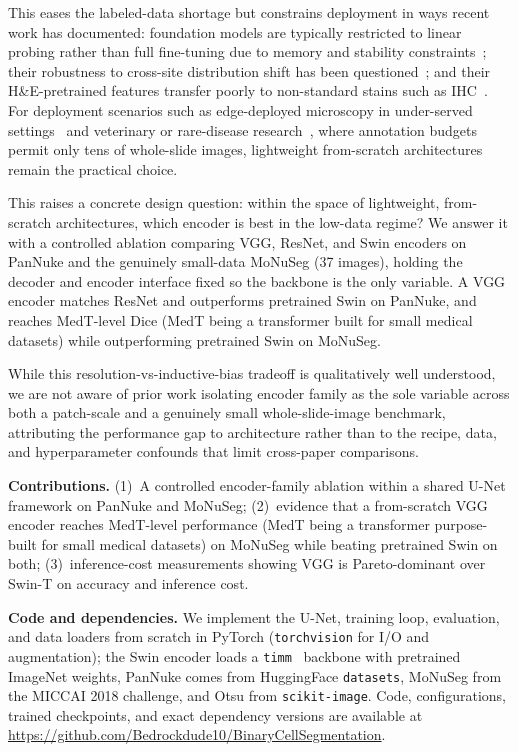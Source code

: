 \documentclass[runningheads]{llncs}
\begin{document}
This eases the labeled-data shortage but constrains deployment in ways recent work has documented: foundation models are typically restricted to linear probing rather than full fine-tuning due to memory and stability constraints~\cite{tizhoosh2025why,campanella2025clinical}; their robustness to cross-site distribution shift has been questioned~\cite{dejong2025current}; and their H\&E-pretrained features transfer poorly to non-standard stains such as IHC~\cite{hua2024pathoduet}. For deployment scenarios such as edge-deployed microscopy in under-served settings~\cite{salido2025realtime} and veterinary or rare-disease research~\cite{xiao2025review}, where annotation budgets permit only tens of whole-slide images, lightweight from-scratch architectures remain the practical choice.

This raises a concrete design question: within the space of lightweight, from-scratch architectures, which encoder is best in the low-data regime? We answer it with a controlled ablation comparing VGG, ResNet, and Swin encoders on PanNuke and the genuinely small-data MoNuSeg (37 images), holding the decoder and encoder interface fixed so the backbone is the only variable. A VGG encoder matches ResNet and outperforms pretrained Swin on PanNuke, and reaches MedT-level Dice (MedT being a transformer built for small medical datasets) while outperforming pretrained Swin on MoNuSeg.

While this resolution-vs-inductive-bias tradeoff is qualitatively well understood, we are not aware of prior work isolating encoder family as the sole variable across both a patch-scale and a genuinely small whole-slide-image benchmark, attributing the performance gap to architecture rather than to the recipe, data, and hyperparameter confounds that limit cross-paper comparisons.

\noindent\textbf{Contributions.} (1)~A controlled encoder-family ablation within a shared U-Net framework on PanNuke and MoNuSeg; (2)~evidence that a from-scratch VGG encoder reaches MedT-level performance (MedT being a transformer purpose-built for small medical datasets) on MoNuSeg while beating pretrained Swin on both; (3)~inference-cost measurements showing VGG is Pareto-dominant over Swin-T on accuracy and inference cost.

\noindent\textbf{Code and dependencies.} We implement the U-Net, training loop, evaluation, and data loaders from scratch in PyTorch (\texttt{torchvision} for I/O and augmentation); the Swin encoder loads a \texttt{timm}~\cite{rw2019timm} backbone with pretrained ImageNet weights, PanNuke comes from HuggingFace \texttt{datasets}, MoNuSeg from the MICCAI 2018 challenge, and Otsu from \texttt{scikit-image}. Code, configurations, trained checkpoints, and exact dependency versions are available at \url{https://github.com/Bedrockdude10/BinaryCellSegmentation}.
\end{document}

